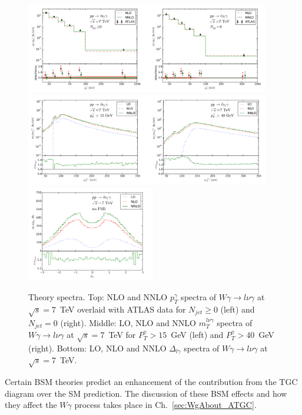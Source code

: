 \begin{figure}[htb]
  \begin{center}
    {\includegraphics[width=0.95\textwidth]{../figs/WgAbout/Theory_NNLO_PtGamma.png}}    
    {\includegraphics[width=0.95\textwidth]{../figs/WgAbout/Theory_NNLO_mT_finer.png}}
    {\includegraphics[width=0.50\textwidth]{../figs/WgAbout/Theory_NNLO_rapidity.png}}
    \caption{Theory spectra. Top: NLO and NNLO $p_T^\gamma$ spectra of $W\gamma\rightarrow l\nu\gamma$ at $\sqrt{s}=7$~TeV overlaid with ATLAS data for $N_{jet} \geq 0$ (left) and $N_{jet}=0$ (right). Middle: LO, NLO and NNLO $m_T^{l\nu\gamma}$ spectra of $W\gamma\rightarrow l\nu\gamma$ at $\sqrt{s}=7$~TeV for $P_T^\gamma>15$~GeV (left) and $P_T^\gamma>40$~GeV (right). Bottom: LO, NLO and NNLO $\Delta_{l\gamma}$ spectra of $W\gamma\rightarrow l\nu\gamma$ at $\sqrt{s}=7$~TeV.}
    \label{fig:Theory_NNLO_and_other}
  \end{center}
\end{figure}

Certain BSM theories predict an enhancement of the contribution from the TGC diagram over the SM prediction. The discussion of these BSM effects and how they affect the $W\gamma$ process takes place in Ch.~\ref{sec:WgAbout_ATGC}.\\ 

